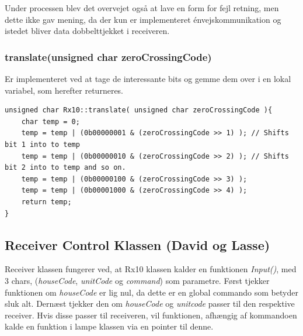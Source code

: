 Under processen blev det overvejet også at lave en form for fejl retning, men dette ikke gav mening, da der kun er implementeret énvejskommunikation og istedet bliver data dobbelttjekket i receiveren.

\subsubsection{translate(unsigned char zeroCrossingCode)}

Er implementeret ved at tage de interessante bits  og gemme dem over i en lokal variabel, som herefter returneres.

\begin{lstlisting}
unsigned char Rx10::translate( unsigned char zeroCrossingCode ){
	char temp = 0;
	temp = temp | (0b00000001 & (zeroCrossingCode >> 1) ); // Shifts bit 1 into to temp
	temp = temp | (0b00000010 & (zeroCrossingCode >> 2) ); // Shifts bit 2 into to temp and so on.
	temp = temp | (0b00000100 & (zeroCrossingCode >> 3) );
	temp = temp | (0b00001000 & (zeroCrossingCode >> 4) );
	return temp;
}
\end{lstlisting}

\subsection{Receiver Control Klassen (David og Lasse)}

Receiver klassen fungerer ved, at Rx10 klassen kalder en funktionen \textit{Input()}, med 3 chars, (\textit{houseCode}, \textit{unitCode} og \textit{command}) som parametre. 
Først tjekker funktionen om \textit{houseCode} er lig nul, da dette er en global commando som betyder sluk alt. Dernæst tjekker den om \textit{houseCode} og \textit{unitcode} passer til den respektive receiver. Hvis disse passer til receiveren, vil funktionen, afhængig af kommandoen kalde en funktion i lampe klassen via en pointer til denne.